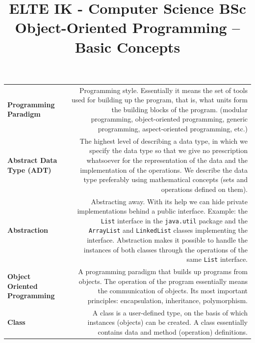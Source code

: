 \documentclass[margin=0px]{article}
\title{\textbf{{\Large ELTE IK - Computer Science BSc} \vspace{0.2cm} \\ {\huge Object-Oriented Programming -- Basic Concepts}}}
\author{}
\date{}
\begin{document}
\maketitle

\begin{center}
\end{center}

\noindent
\begin{longtable}{L R}
\textbf{Programming Paradigm} &
Programming style. Essentially it means the set of tools used for building up the program, that is, what units form the building blocks of the program. (modular programming, object-oriented programming, generic programming, aspect-oriented programming, etc.) \\[4pt]

\textbf{Abstract Data Type (ADT)} &
The highest level of describing a data type, in which we specify the data type so that we give no prescription whatsoever for the representation of the data and the implementation of the operations. We describe the data type preferably using mathematical concepts (sets and operations defined on them). \\[4pt]

\textbf{Abstraction} &
Abstracting away. With its help we can hide private implementations behind a public interface. Example: the \texttt{List} interface in the \texttt{java.util} package and the \texttt{ArrayList} and \texttt{LinkedList} classes implementing the interface. Abstraction makes it possible to handle the instances of both classes through the operations of the same \texttt{List} interface. \\[4pt]

\textbf{Object Oriented Programming} &
A programming paradigm that builds up programs from objects. The operation of the program essentially means the communication of objects. Its most important principles: encapsulation, inheritance, polymorphism. \\[4pt]

\textbf{Class} &
A class is a user-defined type, on the basis of which instances (objects) can be created. A class essentially contains data and method (operation) definitions. \\[4pt]


\end{longtable}
\end{document}
